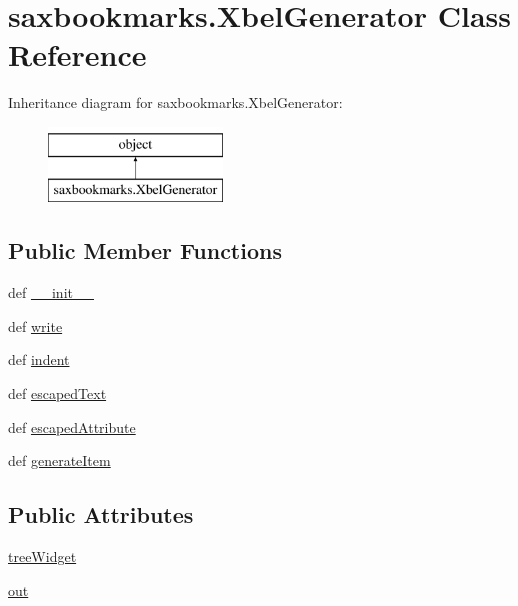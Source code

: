 \hypertarget{classsaxbookmarks_1_1XbelGenerator}{}\section{saxbookmarks.\+Xbel\+Generator Class Reference}
\label{classsaxbookmarks_1_1XbelGenerator}
Inheritance diagram for saxbookmarks.\+Xbel\+Generator\+:\begin{figure}[H]
\begin{center}
\leavevmode
\includegraphics[height=2.000000cm]{classsaxbookmarks_1_1XbelGenerator}
\end{center}
\end{figure}
\subsection*{Public Member Functions}
\begin{DoxyCompactItemize}
\item 
def \hyperlink{classsaxbookmarks_1_1XbelGenerator_a0f4a44d8880b4fda03dc013eb6a976c0}{\+\_\+\+\_\+init\+\_\+\+\_\+}
\item 
def \hyperlink{classsaxbookmarks_1_1XbelGenerator_a3e8aeb6bed22dc6c3d37c9bef58fc74a}{write}
\item 
def \hyperlink{classsaxbookmarks_1_1XbelGenerator_a3e510b66fac52b82d778c33934cd2bfe}{indent}
\item 
def \hyperlink{classsaxbookmarks_1_1XbelGenerator_ab3a56b715931aaf1f691b70e631dd7ae}{escaped\+Text}
\item 
def \hyperlink{classsaxbookmarks_1_1XbelGenerator_aa0843097166f6caba193603d6b40ac3b}{escaped\+Attribute}
\item 
def \hyperlink{classsaxbookmarks_1_1XbelGenerator_ae16e45fbe739bd36e3cae094435c7b8f}{generate\+Item}
\end{DoxyCompactItemize}
\subsection*{Public Attributes}
\begin{DoxyCompactItemize}
\item 
\hyperlink{classsaxbookmarks_1_1XbelGenerator_ab766b017badf0393e3efaf0126a2ce5b}{tree\+Widget}
\item 
\hyperlink{classsaxbookmarks_1_1XbelGenerator_ab4ec8f873bffb1635f687e25580c1604}{out}
\end{DoxyCompactItemize}


